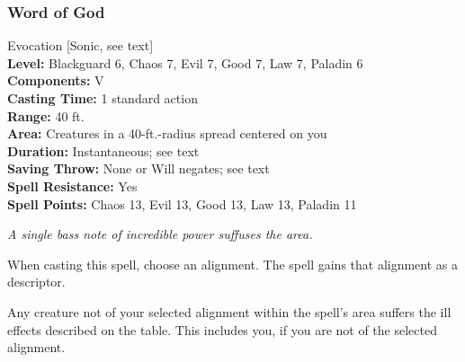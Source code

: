 \subsubsection{Word of God}
\label{Spell:WordOfGod}
Evocation [Sonic, see text]
\\ \textbf{Level:} Blackguard 6, Chaos 7, Evil 7, Good 7, Law 7, Paladin 6
\\ \textbf{Components:} V
\\ \textbf{Casting Time:} 1 standard action
\\ \textbf{Range:} 40 ft.
\\ \textbf{Area:} Creatures in a 40-ft.-radius spread centered on you
\\ \textbf{Duration:} Instantaneous; see text
\\ \textbf{Saving Throw:} None or Will negates; see text
\\ \textbf{Spell Resistance:} Yes
\\ \textbf{Spell Points:} Chaos 13, Evil 13, Good 13, Law 13, Paladin 11

\emph{A single bass note of incredible power suffuses the area.}

When casting this spell, choose an alignment. The spell gains that alignment as a descriptor.

Any creature not of your selected alignment within the spell's area suffers the ill effects
described on the  table. This includes you, if you are not of the selected alignment.
\begin{table}
\label{tab:WordOfGod}
\caption{Word of God}
\end{table}

